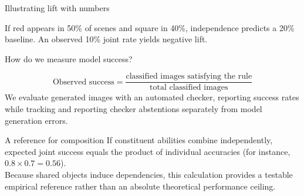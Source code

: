 \documentclass[aspectratio=169,11pt]{beamer}
\begin{document}
\begin{frame}{Illustrating lift with numbers}
\begin{center}\end{center}
\vspace{2mm}
\normalsize If red appears in 50\% of scenes and square in 40\%, independence predicts a 20\% baseline. An observed 10\% joint rate yields negative lift.
\end{frame}

\begin{frame}{How do we measure model success?}
\begin{center}\end{center}
\[\text{Observed success} = \frac{\text{classified images satisfying the rule}}{\text{total classified images}}\]
\vspace{1mm}
\normalsize We evaluate generated images with an automated checker, reporting success rates while tracking and reporting checker abstentions separately from model generation errors.
\end{frame}

\begin{frame}{A reference for composition}
\normalsize If constituent abilities combine independently, expected joint success equals the product of individual accuracies (for instance, $0.8 \times 0.7 = 0.56$).
\vspace{3mm}\\
\normalsize Because shared objects induce dependencies, this calculation provides a testable empirical reference rather than an absolute theoretical performance ceiling.
\end{frame}
\end{document}
